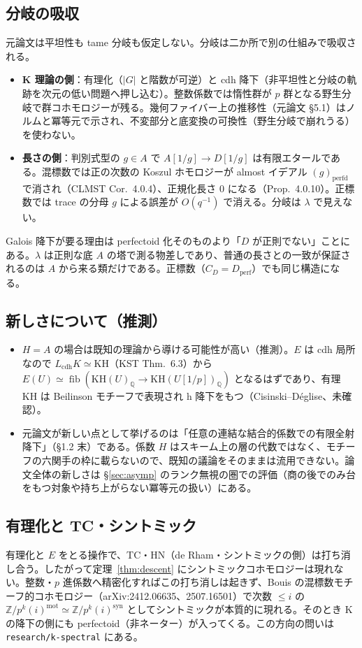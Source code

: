 \documentclass[11pt,a4paper]{ltjsarticle}
\numberwithin{equation}{section}
\theoremstyle{plain}
\theoremstyle{definition}
\theoremstyle{definition}
\newcommand{\Q}{\mathbb{Q}}
\newcommand{\Z}{\mathbb{Z}}
\begin{document}
\subsection{分岐の吸収}
元論文は平坦性も tame 分岐も仮定しない。分岐は二か所で別の仕組みで吸収される。
\begin{itemize}
  \item \textbf{K 理論の側}：有理化（$|G|$ と階数が可逆）と cdh 降下（非平坦性と分岐の軌跡を次元の低い問題へ押し込む）。整数係数では惰性群が $p$ 群となる野生分岐で群コホモロジーが残る。幾何ファイバー上の推移性（元論文 §5.1）はノルムと冪等元で示され、不変部分と底変換の可換性（野生分岐で崩れうる）を使わない。
  \item \textbf{長さの側}：判別式型の $g\in A$ で $A[1/g]\to D[1/g]$ は有限エタールである。混標数では正の次数の Koszul ホモロジーが almost イデアル $(g)_{\mathrm{perfd}}$ で消され（CLMST Cor.~4.0.4）、正規化長さ $0$ になる（Prop.~4.0.10）。正標数では trace の分母 $g$ による誤差が $O(q^{-1})$ で消える。分岐は $\lambda$ で見えない。
\end{itemize}
Galois 降下が要る理由は perfectoid 化そのものより「$D$ が正則でない」ことにある。$\lambda$ は正則な底 $A$ の塔で測る物差しであり、普通の長さとの一致が保証されるのは $A$ から来る類だけである。正標数（$C_D=D_{\mathrm{perf}}$）でも同じ構造になる。

\subsection{新しさについて（推測）}
\begin{itemize}
  \item $H=A$ の場合は既知の理論から導ける可能性が高い（推測）。$E$ は cdh 局所なので $L_{\mathrm{cdh}}K\simeq\mathrm{KH}$（KST Thm.~6.3）から $E(U)\simeq\operatorname{fib}(\mathrm{KH}(U)_\Q\to\mathrm{KH}(U[1/p])_\Q)$ となるはずであり、有理 KH は Beilinson モチーフで表現され h 降下をもつ（Cisinski--Déglise、未確認）。
  \item 元論文が新しい点として挙げるのは「任意の連結な結合的係数での有限全射降下」（§1.2 末）である。係数 $H$ はスキーム上の層の代数ではなく、モチーフの六関手の枠に載らないので、既知の議論をそのままは流用できない。論文全体の新しさは §\ref{sec:asymp} のランク無視の圏での評価（商の後でのみ台をもつ対象や持ち上がらない冪等元の扱い）にある。
\end{itemize}

\subsection{有理化と TC・シントミック}
有理化と $E$ をとる操作で、TC・$\mathrm{HN}$（de Rham・シントミックの側）は打ち消し合う。したがって定理~\ref{thm:descent} にシントミックコホモロジーは現れない。整数・$p$ 進係数へ精密化すればこの打ち消しは起きず、Bouis の混標数モチーフ的コホモロジー（arXiv:2412.06635、2507.16501）で次数 $\le i$ の $\Z/p^k(i)^{\mathrm{mot}}\simeq\Z/p^k(i)^{\mathrm{syn}}$ としてシントミックが本質的に現れる。そのとき K の降下の側にも perfectoid（非ネーター）が入ってくる。この方向の問いは \texttt{research/k-spectral} にある。
\end{document}
